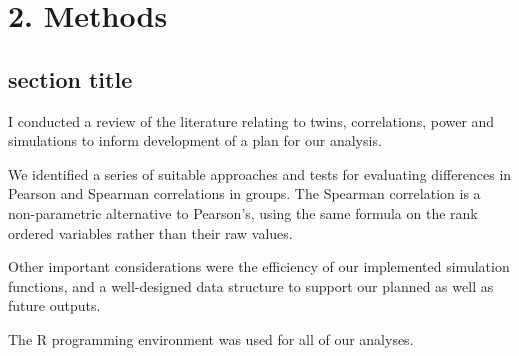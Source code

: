\chapter*{2. Methods}
\setcounter{chapter}{2}
\setcounter{section}{0}


\section{section title}

I conducted a review of the literature relating to twins, correlations, power and simulations to inform development of a plan for our analysis.  

We identified a series of suitable approaches and tests for evaluating differences in Pearson and Spearman correlations in groups.  The Spearman correlation is a non-parametric alternative to Pearson's, using the same formula on the rank ordered variables rather than their raw values.

Other important considerations were the efficiency of our implemented simulation functions, and a well-designed data structure to support our planned as well as future outputs.  

The R programming environment was used for all of our analyses.

